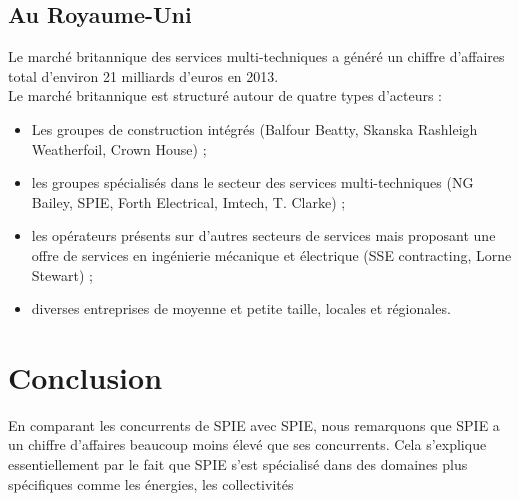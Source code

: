 \subsection{Au Royaume-Uni}

Le marché britannique des services multi-techniques a généré un chiffre d’affaires total d’environ 21 milliards d’euros en 2013. \\

Le marché britannique est structuré autour de quatre types d’acteurs : 
\begin{itemize}
    \item Les groupes de construction intégrés (Balfour Beatty, Skanska Rashleigh Weatherfoil, Crown House) ;
    \item les groupes spécialisés dans le secteur des services multi-techniques (NG Bailey, SPIE, Forth Electrical, Imtech, T. Clarke) ;
    \item les opérateurs présents sur d’autres secteurs de services mais proposant une offre de services en ingénierie mécanique et électrique (SSE contracting, Lorne Stewart) ;
    \item diverses entreprises de moyenne et petite taille, locales et régionales.
\end{itemize}

\section{Conclusion}

En comparant les concurrents de SPIE avec SPIE, nous remarquons que SPIE a un chiffre
d’affaires beaucoup moins élevé que ses concurrents. Cela s’explique essentiellement par le fait que SPIE s’est spécialisé dans des domaines plus spécifiques comme les énergies, les collectivités
